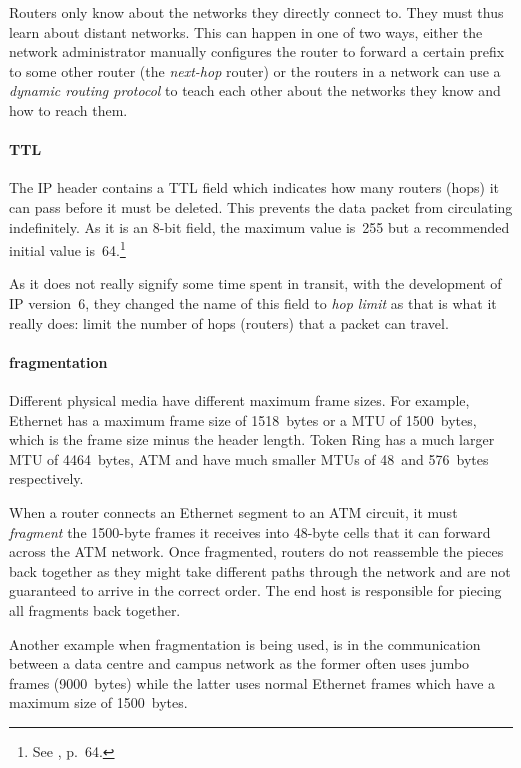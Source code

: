Routers only know about the networks they directly connect to.
They must thus learn about distant networks.
This can happen in one of two ways, either the network administrator manually configures the router to forward a certain prefix to some other router (the \emph{next-hop} router) or the routers in a network can use a \emph{dynamic routing protocol} to teach each other about the networks they know and how to reach them.

\paragraph{\acl{TTL}}
The \acs{IP} header contains a \gls{TTL} field which indicates how many routers (hops) it can pass before it must be deleted.
This prevents the data packet from circulating indefinitely.
As it is an 8-bit field, the maximum value is~255 but a recommended initial value is~64.\footnote{See , p.~64.}

As it does not really signify some time spent in transit, with the development of \acs{IP} version~6, they changed the name of this field to \emph{hop limit} as that is what it really does: limit the number of hops (routers) that a packet can travel.


\paragraph{fragmentation}
Different physical media have different maximum frame sizes.
For example, Ethernet has a maximum frame size of 1518~bytes or a \gls{MTU} of 1500~bytes, which is the frame size minus the header length.
Token Ring has a much larger \gls{MTU} of 4464~bytes, \gls{ATM} and  have much smaller \acp{MTU} of 48~and 576~bytes respectively.

When a router connects an Ethernet segment to an \gls{ATM} circuit, it must \emph{fragment} the 1500-byte frames it receives into 48-byte cells that it can forward across the \ac{ATM} network.
Once fragmented, routers do not reassemble the pieces back together as they might take different paths through the network and are not guaranteed to arrive in the correct order.
The end host is responsible for piecing all fragments back together.

Another example when fragmentation is being used, is in the communication between a data centre and campus network as the former often uses jumbo frames (9000~bytes) while the latter uses normal Ethernet frames which have a maximum size of 1500~bytes.%

